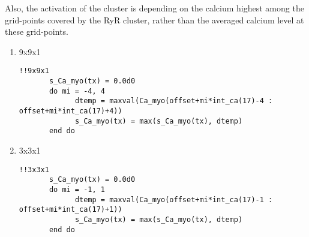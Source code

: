 Also, the activation of the cluster is depending on the calcium highest among
the grid-points covered by the RyR cluster, rather than the averaged calcium
level at these grid-points.
\begin{enumerate}
  \item 9x9x1
\begin{verbatim}
!!9x9x1
       s_Ca_myo(tx) = 0.0d0
       do mi = -4, 4
             dtemp = maxval(Ca_myo(offset+mi*int_ca(17)-4 : offset+mi*int_ca(17)+4))
             s_Ca_myo(tx) = max(s_Ca_myo(tx), dtemp)
       end do
\end{verbatim}

  \item 3x3x1
\begin{verbatim}
!!3x3x1
       s_Ca_myo(tx) = 0.0d0
       do mi = -1, 1
             dtemp = maxval(Ca_myo(offset+mi*int_ca(17)-1 : offset+mi*int_ca(17)+1))
             s_Ca_myo(tx) = max(s_Ca_myo(tx), dtemp)
       end do
\end{verbatim}  
\end{enumerate}


